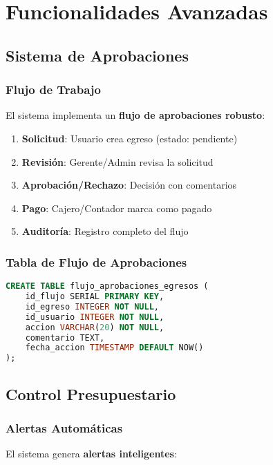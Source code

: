 \documentclass[12pt,a4paper]{article}
\newcommand{\highlight}[1]{\textcolor{primaryblue}{\textbf{#1}}}
\begin{document}
\section{Funcionalidades Avanzadas}

\subsection{Sistema de Aprobaciones}

\subsubsection{Flujo de Trabajo}
El sistema implementa un \highlight{flujo de aprobaciones robusto}:

\begin{enumerate}[leftmargin=*]
    \item \textbf{Solicitud}: Usuario crea egreso (estado: pendiente)
    \item \textbf{Revisión}: Gerente/Admin revisa la solicitud
    \item \textbf{Aprobación/Rechazo}: Decisión con comentarios
    \item \textbf{Pago}: Cajero/Contador marca como pagado
    \item \textbf{Auditoría}: Registro completo del flujo
\end{enumerate}

\subsubsection{Tabla de Flujo de Aprobaciones}
\begin{lstlisting}[language=SQL, caption=Auditoría completa de aprobaciones]
CREATE TABLE flujo_aprobaciones_egresos (
    id_flujo SERIAL PRIMARY KEY,
    id_egreso INTEGER NOT NULL,
    id_usuario INTEGER NOT NULL,
    accion VARCHAR(20) NOT NULL,
    comentario TEXT,
    fecha_accion TIMESTAMP DEFAULT NOW()
);
\end{lstlisting}

\subsection{Control Presupuestario}

\subsubsection{Alertas Automáticas}
El sistema genera \highlight{alertas inteligentes}:
\end{document}
